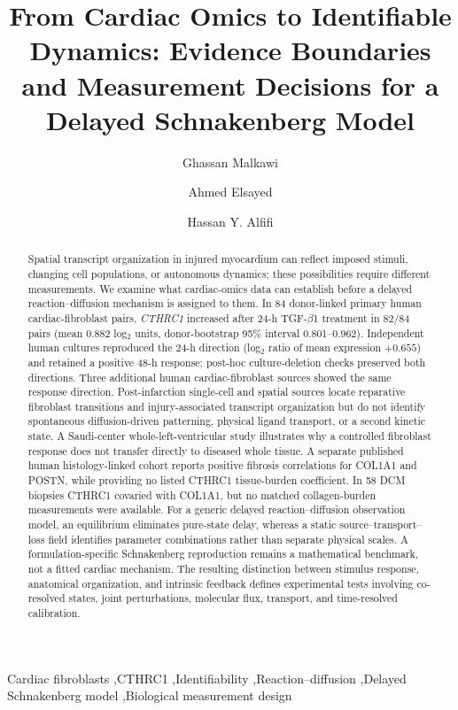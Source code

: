\documentclass[preprint,11pt]{elsarticle}
\newcommand{\cthrc}{\textit{CTHRC1}}
\newcommand{\tgfb}{TGF-$\beta$1}
\begin{document}
\begin{frontmatter}
\title{From Cardiac Omics to Identifiable Dynamics: Evidence Boundaries and Measurement Decisions for a Delayed Schnakenberg Model}
\author[inst1]{Ghassan Malkawi}
\author[inst2]{Ahmed Elsayed}
\author[inst3,inst4]{Hassan Y. Alfifi}
\address[inst1]{Faculty of Computer Information Science, Higher Colleges of Technology, Al Ain, United Arab Emirates}
\address[inst2]{Department of Computer Engineering and Computational Sciences, Canadian University Dubai, Dubai, United Arab Emirates}
\address[inst3]{Mathematics Department, College of Science, Imam Abdulrahman Bin Faisal University, Dammam 31441, Saudi Arabia}
\address[inst4]{Basic \& Applied Scientific Research Center, Imam Abdulrahman Bin Faisal University, Dammam 31441, Saudi Arabia}

\begin{abstract}
Spatial transcript organization in injured myocardium can reflect imposed stimuli, changing cell populations, or autonomous dynamics; these possibilities require different measurements. We examine what cardiac-omics data can establish before a delayed reaction--diffusion mechanism is assigned to them. In 84 donor-linked primary human cardiac-fibroblast pairs, \cthrc{} increased after 24-h \tgfb{} treatment in 82/84 pairs (mean 0.882 log$_2$ units, donor-bootstrap 95\% interval 0.801--0.962). Independent human cultures reproduced the 24-h direction (log$_2$ ratio of mean expression $+0.655$) and retained a positive 48-h response; post-hoc culture-deletion checks preserved both directions. Three additional human cardiac-fibroblast sources showed the same response direction. Post-infarction single-cell and spatial sources locate reparative fibroblast transitions and injury-associated transcript organization but do not identify spontaneous diffusion-driven patterning, physical ligand transport, or a second kinetic state. A Saudi-center whole-left-ventricular study illustrates why a controlled fibroblast response does not transfer directly to diseased whole tissue. A separate published human histology-linked cohort reports positive fibrosis correlations for COL1A1 and POSTN, while providing no listed CTHRC1 tissue-burden coefficient. In 58 DCM biopsies CTHRC1 covaried with COL1A1, but no matched collagen-burden measurements were available. For a generic delayed reaction--diffusion observation model, an equilibrium eliminates pure-state delay, whereas a static source--transport--loss field identifies parameter combinations rather than separate physical scales. A formulation-specific Schnakenberg reproduction remains a mathematical benchmark, not a fitted cardiac mechanism. The resulting distinction between stimulus response, anatomical organization, and intrinsic feedback defines experimental tests involving co-resolved states, joint perturbations, molecular flux, transport, and time-resolved calibration.
\end{abstract}
\begin{keyword}
Cardiac fibroblasts \sep CTHRC1 \sep Identifiability \sep Reaction--diffusion \sep Delayed Schnakenberg model \sep Biological measurement design
\end{keyword}
\end{frontmatter}
\end{document}
